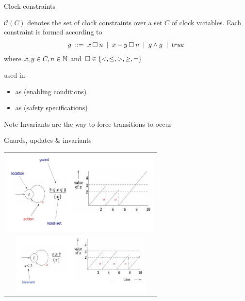 \documentclass[aspectratio=169]{beamer}
\def\cc#1{\mathcal{C}(#1)}
\begin{document}
\begin{slide}{Clock constraints}
\small

$\cc{C}$ denotes the  set of clock constraints over a set $C$ of clock variables.
Each constraint is formed according to 
\begin{equation*}
g \; ::=\; x \mathbin{\square} n \; \mid\; x - y \mathbin{\square} n  \; \mid\; g \mathbin{\wedge} g \;\mid\; true
\end{equation*}
where $x,y \in C, n \in \mathbb{N}$ and $\square \in \mathopen{ \{ }<,\leq,>,\geq,=\mathclose{ \} }$


used in
\begin{itemize}
\item  {} as  (enabling conditions)
\item  {} as  (safety specifications)
\end{itemize}

\begin{block}{Note}
Invariants are the  way to force transitions to occur
\end{block}
\end{slide}

\begin{slide}{Guards, updates \&  invariants}
\small \centering

\begin{tabular}{c}
   \includegraphics[width=8cm]{./images/model0.jpg} \\  \includegraphics[width=7cm]{./images/model1.jpg}
\end{tabular}

\end{slide}
\end{document}
